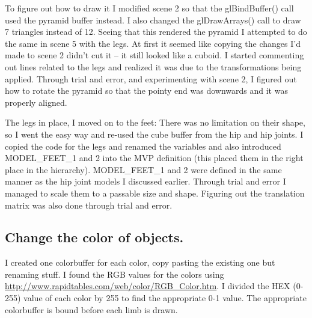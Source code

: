To figure out how to draw it I modified scene 2 so that the glBindBuffer() call used the pyramid buffer instead.
I also changed the glDrawArrays() call to draw 7 triangles instead of 12.
Seeing that this rendered the pyramid I attempted to do the same in scene 5 with the legs.
At first it seemed like copying the changes I'd made to scene 2 didn't cut it -- it still looked like a cuboid.
I started commenting out lines related to the legs and realized it was due to the transformations being applied.
Through trial and error, and experimenting with scene 2, I figured out how to rotate the pyramid so that the pointy end was downwards and it was properly aligned.

The legs in place, I moved on to the feet:
There was no limitation on their shape, so I went the easy way and re-used the cube buffer from the hip and hip joints.
I copied the code for the legs and renamed the variables and also introduced MODEL\_FEET\_1 and 2 into the MVP definition (this placed them in the right place in the hierarchy).
MODEL\_FEET\_1 and 2 were defined in the same manner as the hip joint models I discussed earlier.
Through trial and error I managed to scale them to a passable size and shape.
Figuring out the translation matrix was also done through trial and error.

\subsection{Change the color of objects.}

I created one colorbuffer for each color, copy pasting the existing one but renaming stuff.
I found the RGB values for the colors using \url{http://www.rapidtables.com/web/color/RGB_Color.htm}.
I divided the HEX (0-255) value of each color by 255 to find the appropriate 0-1 value.
The appropriate colorbuffer is bound before each limb is drawn.

